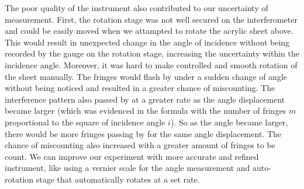 \documentclass[12pt]{article}
\begin{document}
The poor quality of the instrument also contributed to our uncertainty of measurement. First, the rotation stage was not well secured on the interferometer and could be easily moved when we attampted to rotate the acrylic sheet above. This would result in unexpected change in the angle of incidence without being recorded by the gauge on the rotation stage, increasing the uncertainty within the incidence angle. Moreover, it was hard to make controlled and smooth rotation of the sheet manually. The fringes would flash by under a sudden change of angle without being noticed and resulted in a greater chance of miscounting. The interference pattern also passed by at a greater rate as the angle displacement became larger (which was evidenced in the formula with the number of fringes $m$ proportional to the square of incidence angle $i$). So as the angle became larger, there would be more fringes passing by for the same angle displacement. The chance of miscounting also increased with a greater amount of fringes to be count. We can improve our experiment with more accurate and refined instrument, like using a vernier scale for the angle measurement and auto-rotation stage that automatically rotates at a set rate. 
\end{document}
